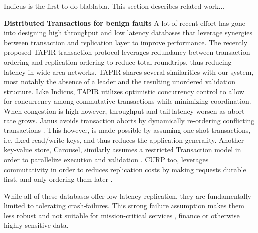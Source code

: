 Indicus is the first to do blablabla. This section describes related work...

\textbf{Distributed Transactions for benign faults}
A lot of recent effort has gone into designing high throughput and low latency databases that leverage synergies between transaction and replication layer to improve performance. The recently proposed TAPIR transaction protocol leverages redundancy between transaction ordering and replication ordering to reduce total roundtrips, thus reducing latency in wide area networks. TAPIR shares several similarities with our system, most notably the absence of a leader and the resulting unordered validation structure. Like Indicus, TAPIR utilizes optimistic concurrency control to allow for concurrency among commutative transactions while minimizing coordination. When congestion is high however, throughput and tail latency worsen as abort rate grows. Janus avoids transaction aborts by dynamically re-ordering conflicting transactions \cite{mu2016consolidating}. This however, is made possible by assuming one-shot transactions, i.e. fixed read/write keys, and thus reduces the application generality. Another key-value store, Carousel, similarly assumes a restricted Transaction model in order to parallelize execution and validation \cite{yan2018carousel}. CURP too, leverages commutativity in order to reduces replication costs by making requests durable first, and only ordering them later \cite{park2019exploiting}. 

While all of these databases offer low latency replication, they are fundamentally limited to tolerating crash-failures. This strong failure assumption makes them less robust and not suitable for mission-critical services \cite{Abdollah2007}, finance or otherwise highly sensitive data.

